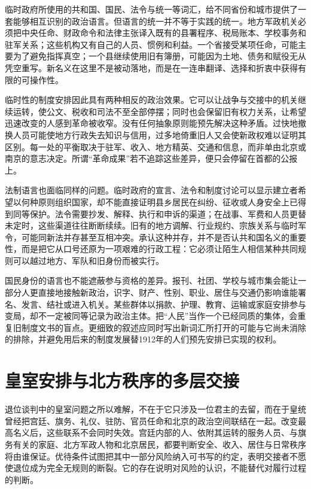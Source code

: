 临时政府所使用的共和国、国民、法令与统一等词汇，给不同省份和城市提供了一套能够相互识别的政治语言。但语言的统一并不等于实践的统一。地方军政机关必须把中央任命、财政命令和法律主张译入既有的县署程序、税局账本、学校事务和驻军关系；这些机构又有自己的人员、惯例和利益。一个省接受某项任命，可能主要为了避免指挥真空；一个县继续使用旧有簿册，可能因为土地、债务和赋役无从凭空重写。新名义在这里不是被动落地，而是在一连串翻译、选择和折衷中获得有限的可操作性。

临时性的制度安排因此具有两种相反的政治效果。它可以让战争与交接中的机关继续运转，使公文、税收和司法不至全部停摆；同时也会保留旧有权力关系，让希望迅速改变的人感到革命被收窄。没有任何抽象原则能预先解决这种矛盾。过快地撤换人员可能使地方行政失去知识与信用，过多地倚重旧人又会使新政权难以证明其区别。每一处的平衡取决于驻军、收入、地方精英、交通和信息，而非单由北京或南京的意志决定。所谓“革命成果”若不追踪这些差异，便只会停留在首都的公报上。

法制语言也面临同样的问题。临时政府的宣言、法令和制度讨论可以显示建立者希望以何种原则组织国家，却不能直接证明县乡居民在纠纷、征收或人身安全上已得到同等保护。法令需要抄发、解释、执行和申诉的渠道；在战事、军费和人员更替未定时，这些渠道往往断断续续。旧有的地方调解、行业规约、宗族关系与临时军令，可能同新法并存甚至互相冲突。承认这种并存，并不是否认共和国名义的重要性，而是把它从口号还原为一项艰难的行政工程：它必须让陌生人相信某种共同规则可以越过地方、军队和旧身份而被实行。

国民身份的语言也不能遮蔽参与资格的差异。报刊、社团、学校与城市集会能让一部分人更直接地接触新政治，识字、财产、性别、职业、居住与交通仍影响谁能署名、发言、结社或进入机关。某些群体以捐款、护理、教育、运输或家庭安排参与变局，却不一定被同等记录为政治主体。把“人民”当作一个已经同质的集体，会重复旧制度文书的盲点。更细致的叙述应同时写出新词汇所打开的可能与它尚未消除的排除，并避免用后来的制度发展替1912年的人们预先安排已实现的权利。

\section{皇室安排与北方秩序的多层交接}

退位谈判中的皇室问题之所以难解，不在于它只涉及一位君主的去留，而在于皇统曾经把宫廷、旗务、礼仪、驻防、官员任命和北京的政治空间联结在一起。改变最高名义后，这些联系不会同时失效。宫廷内部的人、依附其运转的服务人员、与旗务有关的家庭、北方军政人物和北京居民，都要判断安全、收入、居住与日常秩序将由谁保证。优待条件试图把其中一部分风险纳入可书写的约定，表明交接者不愿使退位成为完全无规则的断裂。它的存在说明对风险的认识，不能替代对履行过程的判断。


